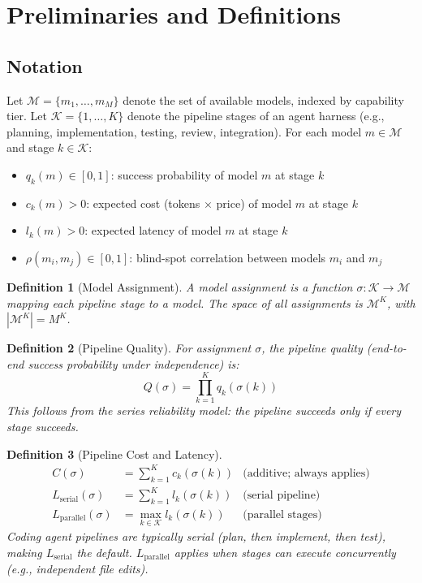 \documentclass[11pt, a4paper, copyright]{googledeepmind}
\newtheorem{definition}{Definition}[section]
\begin{document}
\section{Preliminaries and Definitions}
\label{sec:prelim}

\subsection{Notation}

Let $\mathcal{M} = \{m_1, \ldots, m_M\}$ denote the set of available models, indexed by capability tier. Let $\mathcal{K} = \{1, \ldots, K\}$ denote the pipeline stages of an agent harness (e.g., planning, implementation, testing, review, integration). For each model $m \in \mathcal{M}$ and stage $k \in \mathcal{K}$:

\begin{itemize}
\item $q_k(m) \in [0,1]$: success probability of model $m$ at stage $k$
\item $c_k(m) > 0$: expected cost (tokens $\times$ price) of model $m$ at stage $k$
\item $l_k(m) > 0$: expected latency of model $m$ at stage $k$
\item $\rho(m_i, m_j) \in [0,1]$: blind-spot correlation between models $m_i$ and $m_j$
\end{itemize}

\begin{definition}[Model Assignment]
A \emph{model assignment} is a function $\sigma: \mathcal{K} \to \mathcal{M}$ mapping each pipeline stage to a model. The space of all assignments is $\mathcal{M}^K$, with $|\mathcal{M}^K| = M^K$.
\end{definition}

\begin{definition}[Pipeline Quality]
For assignment $\sigma$, the pipeline quality (end-to-end success probability under independence) is:
\begin{equation}
Q(\sigma) = \prod_{k=1}^{K} q_k(\sigma(k))
\end{equation}
This follows from the series reliability model: the pipeline succeeds only if every stage succeeds.
\end{definition}

\begin{definition}[Pipeline Cost and Latency]
\begin{align}
C(\sigma) &= \sum_{k=1}^{K} c_k(\sigma(k)) & \text{(additive; always applies)} \\
L_{\mathrm{serial}}(\sigma) &= \sum_{k=1}^{K} l_k(\sigma(k)) & \text{(serial pipeline)} \\
L_{\mathrm{parallel}}(\sigma) &= \max_{k \in \mathcal{K}} l_k(\sigma(k)) & \text{(parallel stages)}
\end{align}
Coding agent pipelines are typically serial (plan, then implement, then test), making $L_{\mathrm{serial}}$ the default. $L_{\mathrm{parallel}}$ applies when stages can execute concurrently (e.g., independent file edits).
\end{definition}
\end{document}
